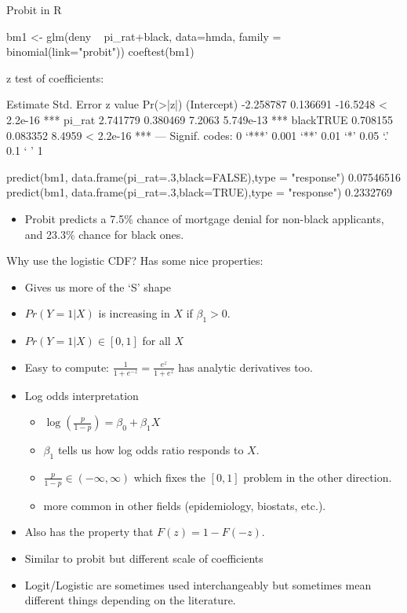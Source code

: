 \documentclass[aspectratio=169]{beamer}
\begin{document}
\begin{frame}[fragile]{Probit in R}
\footnotesize
\begin{semiverbatim}
bm1 <- glm(deny ~ pi_rat+black, data=hmda, family = binomial(link="probit"))
coeftest(bm1)

z test of coefficients:

             Estimate Std. Error  z value  Pr(>|z|)    
(Intercept) -2.258787   0.136691 -16.5248 < 2.2e-16 ***
pi_rat       2.741779   0.380469   7.2063 5.749e-13 ***
blackTRUE    0.708155   0.083352   8.4959 < 2.2e-16 ***
---
    Signif. codes:  0 `***' 0.001 `**' 0.01 `*' 0.05 `.' 0.1 ` ' 1

predict(bm1, data.frame(pi_rat=.3,black=FALSE),type = "response")
    0.07546516
predict(bm1, data.frame(pi_rat=.3,black=TRUE),type = "response")
    0.2332769
\end{semiverbatim}
\begin{itemize}
\item Probit predicts a 7.5\% chance of mortgage denial for non-black applicants, and 23.3\% chance for black ones.
\end{itemize}
\end{frame}

\begin{frame}{Why use the logistic CDF?}
Has some nice properties:
\begin{itemize}
\item Gives us more of the `S' shape
\item $Pr(Y=1|X)$ is increasing in $X$ if $\beta_1>0$.
\item $Pr(Y=1|X) \in [0,1]$ for all $X$
\item Easy to compute: $\frac{1}{1+e^{-z}}=\frac{e^{z}}{1+e^{z}}$ has analytic derivatives too.
\item Log odds interpretation
\begin{itemize}
\item $\log(\frac{p}{1-p}) = \beta_0 + \beta_1 X$
\item $\beta_1$ tells us how \alert{log odds ratio} responds to $X$.
\item $\frac{p}{1-p} \in (-\infty,\infty)$ which fixes the $[0,1]$ problem in the other direction.
\item more common in other fields (epidemiology, biostats, etc.).
\end{itemize}
\item Also has the property that $F(z) = 1-F(-z)$.
\item Similar to probit but different scale of coefficients
\item Logit/Logistic are sometimes used interchangeably but sometimes mean different things depending on the literature.
\end{itemize}
\end{frame}
\end{document}
